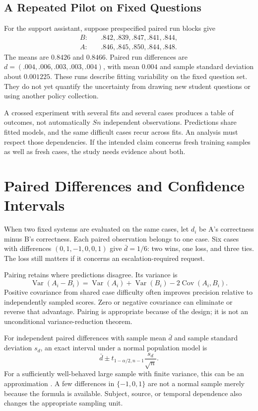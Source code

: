 \subsection{A Repeated Pilot on Fixed Questions}

For the support assistant, suppose prespecified paired run blocks give
\[
\begin{aligned}
B:&\quad .842,.839,.847,.841,.844,\\
A:&\quad .846,.845,.850,.844,.848.
\end{aligned}
\]
The means are $0.8426$ and $0.8466$. Paired run differences are
$d=(.004,.006,.003,.003,.004)$, with mean $0.004$ and sample standard deviation about $0.001225$. These runs describe fitting variability on the fixed question set. They do not yet quantify the uncertainty from drawing new student questions or using another policy collection.

A crossed experiment with several fits and several cases produces a table of outcomes, not automatically $S n$ independent observations. Predictions share fitted models, and the same difficult cases recur across fits. An analysis must respect those dependencies. If the intended claim concerns fresh training samples as well as fresh cases, the study needs evidence about both.

\section{Paired Differences and Confidence Intervals}

When two fixed systems are evaluated on the same cases, let $d_i$ be A's correctness minus B's correctness. Each paired observation belongs to one case. Six cases with differences $(0,1,-1,0,0,1)$ give $\bar d=1/6$: two wins, one loss, and three ties. The loss still matters if it concerns an escalation-required request.

Pairing retains where predictions disagree. Its variance is
\[
\operatorname{Var}(A_i-B_i)=\operatorname{Var}(A_i)+\operatorname{Var}(B_i)
-2\operatorname{Cov}(A_i,B_i).
\]
Positive covariance from shared case difficulty often improves precision relative to independently sampled scores. Zero or negative covariance can eliminate or reverse that advantage. Pairing is appropriate because of the design; it is not an unconditional variance-reduction theorem.

For independent paired differences with sample mean $\bar d$ and sample standard deviation $s_d$, an exact interval under a normal population model is
\[
\bar d\pm t_{1-\alpha/2,n-1}\frac{s_d}{\sqrt n}.
\]
For a sufficiently well-behaved large sample with finite variance, this can be an approximation \citep{nistPairedCI}. A few differences in $\{-1,0,1\}$ are not a normal sample merely because the formula is available. Subject, source, or temporal dependence also changes the appropriate sampling unit.


